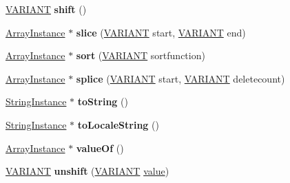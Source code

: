 \begin{DoxyCompactItemize}
\hyperlink{structtag_v_a_r_i_a_n_t}{V\+A\+R\+I\+A\+NT} {\bfseries shift} ()
\item 
\mbox{\label{interface_j_s_global_1_1_array_instance_a50d301b5fb4f1d68c695a989d5370632}} 
\hyperlink{interface_j_s_global_1_1_array_instance}{Array\+Instance} $\ast$ {\bfseries slice} (\hyperlink{structtag_v_a_r_i_a_n_t}{V\+A\+R\+I\+A\+NT} start, \hyperlink{structtag_v_a_r_i_a_n_t}{V\+A\+R\+I\+A\+NT} end)
\item 
\mbox{\label{interface_j_s_global_1_1_array_instance_a7e019b82defff71f25c76feea19ec48f}} 
\hyperlink{interface_j_s_global_1_1_array_instance}{Array\+Instance} $\ast$ {\bfseries sort} (\hyperlink{structtag_v_a_r_i_a_n_t}{V\+A\+R\+I\+A\+NT} sortfunction)
\item 
\mbox{\label{interface_j_s_global_1_1_array_instance_a0edc5f0d36cc2b74046abc7743095571}} 
\hyperlink{interface_j_s_global_1_1_array_instance}{Array\+Instance} $\ast$ {\bfseries splice} (\hyperlink{structtag_v_a_r_i_a_n_t}{V\+A\+R\+I\+A\+NT} start, \hyperlink{structtag_v_a_r_i_a_n_t}{V\+A\+R\+I\+A\+NT} deletecount)
\item 
\mbox{\label{interface_j_s_global_1_1_array_instance_a7c39563c82c9a1a82332bb7c298e5202}} 
\hyperlink{interface_j_s_global_1_1_string_instance}{String\+Instance} $\ast$ {\bfseries to\+String} ()
\item 
\mbox{\label{interface_j_s_global_1_1_array_instance_a173ef2f3fee6062c524ff5876944e28d}} 
\hyperlink{interface_j_s_global_1_1_string_instance}{String\+Instance} $\ast$ {\bfseries to\+Locale\+String} ()
\item 
\mbox{\label{interface_j_s_global_1_1_array_instance_ad957422bf33d6ade8237e8d6663cafb3}} 
\hyperlink{interface_j_s_global_1_1_array_instance}{Array\+Instance} $\ast$ {\bfseries value\+Of} ()
\item 
\mbox{\label{interface_j_s_global_1_1_array_instance_aebf4074bea25ef87cc87fca4492f2aaf}} 
\hyperlink{structtag_v_a_r_i_a_n_t}{V\+A\+R\+I\+A\+NT} {\bfseries unshift} (\hyperlink{structtag_v_a_r_i_a_n_t}{V\+A\+R\+I\+A\+NT} \hyperlink{unionvalue}{value})

\end{DoxyCompactItemize}
